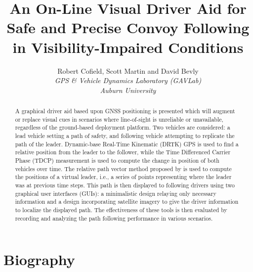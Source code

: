 \documentclass[twocolumn,10pt]{article}
\begin{document}

\title{\textbf{An On-Line Visual Driver Aid for Safe and Precise Convoy Following in Visibility-Impaired Conditions}}
\author{
  Robert Cofield, Scott Martin and David Bevly \\
  \em{GPS \& Vehicle Dynamics Laboratory (GAVLab)} \\
  \em{Auburn University} \\
}
\date{} %
\maketitle


\begin{abstract}

  A graphical driver aid based upon GNSS positioning is presented which will augment or replace visual cues in scenarios where line-of-sight is unreliable or unavailable, regardless of the ground-based deployment platform.
  Two vehicles are considered: a lead vehicle setting a path of safety, and following vehicle attempting to replicate the path of the leader.
  Dynamic-base Real-Time Kinematic (DRTK) GPS is used to find a relative position from the leader to the follower, while the Time Differenced Carrier Phase (TDCP) measurement is used to compute the change in position of both vehicles over time.
  The relative path vector method proposed by \cite{travisdiss} is used to compute the positions of a virtual leader, i.e., a series of points representing where the leader was at previous time steps.
  This path is then displayed to following drivers using two graphical user interfaces (GUIs): a minimalistic design relaying only necessary information and a design incorporating satellite imagery to give the driver information to localize the displayed path.
  The effectiveness of these tools is then evaluated by recording and analyzing the path following performance in various scenarios.

\end{abstract}


\section*{Biography}
\end{document}
